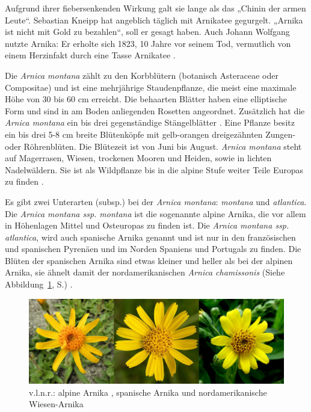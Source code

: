 Aufgrund ihrer fiebersenkenden Wirkung galt sie lange als das „Chinin der armen Leute“. Sebastian Kneipp hat angeblich täglich mit Arnikatee gegurgelt. „Arnika ist nicht mit Gold zu bezahlen“, soll er gesagt haben. Auch Johann Wolfgang nutzte Arnika: Er erholte sich 1823, 10 Jahre vor seinem Tod, vermutlich von einem Herzinfakt durch eine Tasse Arnikatee \citep[vgl.][S.56]{Franke2012}.

Die \textit{Arnica montana} zählt zu den Korbblütern (botanisch Asteraceae oder Compositae) und ist eine mehrjährige Staudenpflanze, die meist eine maximale Höhe von 30 bis 60 cm erreicht. Die behaarten Blätter haben eine elliptische Form und sind in am Boden anliegenden Rosetten angeordnet. Zusätzlich hat die \textit{Arnica montana} ein bis drei gegenständige Stängelblätter \citep[vgl.][]{Wyk2015, FNR2013}. Eine Pflanze besitz ein bis drei 5-8 cm breite Blütenköpfe mit gelb-orangen dreigezähnten Zungen- oder Röhrenblüten. Die Blütezeit ist von Juni bis August. \textit{Arnica montana} steht auf Magerrasen, Wiesen, trockenen Mooren und Heiden, sowie in lichten Nadelwäldern. Sie ist als Wildpflanze bis in die alpine Stufe weiter Teile Europas zu finden \citep[vgl.][]{Schoenfelder2011, FNR2013}.

Es gibt zwei Unterarten (subsp.) bei der \textit{Arnica montana}: \textit{montana} und \textit{atlantica}. Die \textit{Arnica montana ssp. montana} ist die sogenannte alpine Arnika, die vor allem in Höhenlagen Mittel und Osteuropas zu finden ist. Die \textit{Arnica montana ssp. atlantica}, wird auch spanische Arnika genannt und ist nur in den französischen und spanischen Pyrenäen und im Norden Spaniens und Portugals zu finden. Die Blüten der spanischen Arnika sind etwas kleiner und heller als bei der alpinen Arnika, sie ähnelt damit der nordamerikanischen \textit{Arnica chamissonis} (Siehe Abbildung~\ref{fig:Unterarten}, S.\pageref{fig:Unterarten}) \citep[vgl.][S. 61]{Franke2012}.

\begin{figure}[htb]
 \centering
 \includegraphics[width=\textwidth,angle=0]{abb/Arnika/arnica-900x300}
 \caption{v.l.n.r.: alpine Arnika \citep{Moro2019}, spanische Arnika \citep{Pereira2019} und nordamerikanische Wiesen-Arnika \citep{Rowlin2019}}
\label{fig:Unterarten}
\end{figure}

